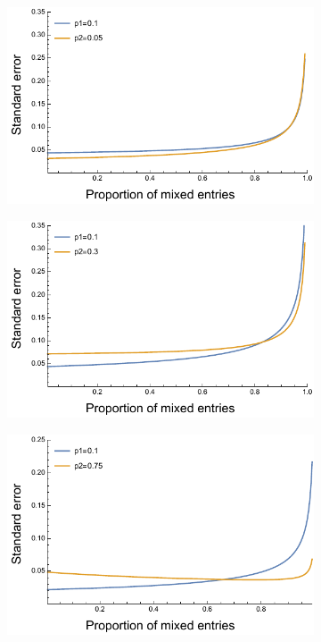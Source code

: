 \documentclass{article}
\begin{document}
\begin{figure}[H]
\begin{subfigure}[b]{.49\textwidth}
\includegraphics[width=\textwidth]{../asymptotic_approximation/SE_twotype_p1_01_p2_005.pdf}
\end{subfigure}
\hfill
\begin{subfigure}[b]{0.49\textwidth}
\includegraphics[width=\textwidth]{../asymptotic_approximation/SE_twotype_p1_01_p2_03.pdf}
\end{subfigure}
\hfill
\begin{subfigure}[b]{0.49\textwidth}
\includegraphics[width=\textwidth]{../asymptotic_approximation/SE_twotype_p1_01_p2_075.pdf}

\end{subfigure}
\end{figure}
\end{document}
